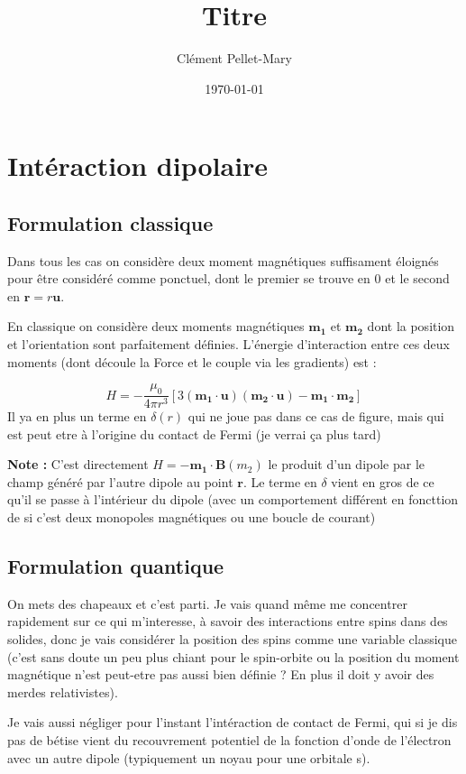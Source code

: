 \documentclass[a4paper]{article}
\title{Titre}
\author{Clément Pellet-Mary}
\date\today
\begin{document}
  \section{Intéraction dipolaire}
  \subsection{Formulation classique}
  Dans tous les cas on considère deux moment magnétiques suffisament éloignés pour être considéré comme ponctuel, dont le premier se trouve en 0 et le second en $\mathbf{r}=r\mathbf{u}$.
  
  En classique on considère deux moments magnétiques $\mathbf{m_1}$ et $\mathbf{m_2}$ dont la position et l'orientation sont parfaitement définies. L'énergie d'interaction entre ces deux moments (dont découle la Force et le couple via les gradients) est :
  
  \begin{equation}
  H=-\frac{\mu_0}{4 \pi r^3}[3(\mathbf{m_1}\cdot \mathbf{u})(\mathbf{m_2}\cdot \mathbf{u})-\mathbf{m_1}\cdot \mathbf{m_2}]
  \end{equation}
 Il ya en plus un terme en $\delta (r)$ qui ne joue pas dans ce cas de figure, mais qui est peut etre à l'origine du contact de Fermi (je verrai ça plus tard)
 
 \textbf{Note :} C'est directement $H=-\mathbf{m_1} \cdot \mathbf{B}(m_2)$ le produit d'un dipole par le champ généré par l'autre dipole au point $\mathbf{r}$. Le terme en $\delta$ vient en gros de ce qu'il se passe à l'intérieur du dipole (avec un comportement différent en foncttion de si c'est deux monopoles magnétiques ou une boucle de courant)
 
 \subsection{Formulation quantique}
 On mets des chapeaux et c'est parti. Je vais quand même me concentrer rapidement sur ce qui m'interesse, à savoir des interactions entre spins dans des solides, donc je vais considérer la position des spins comme une variable classique (c'est sans doute un peu plus chiant pour le spin-orbite ou la position du moment magnétique n'est peut-etre pas aussi bien définie ? En plus il doit y avoir des merdes relativistes). 
 
 Je vais aussi négliger pour l'instant l'intéraction de contact de Fermi, qui si je dis pas de bétise vient du recouvrement potentiel de la fonction d'onde de l'électron avec un autre dipole (typiquement un noyau pour une orbitale s).
 
\end{document}
